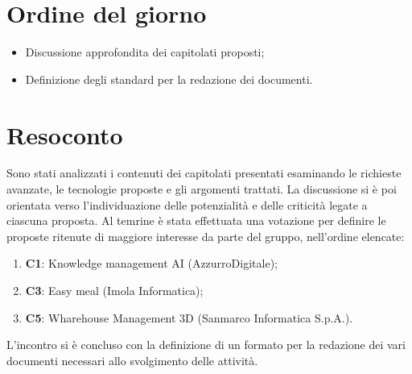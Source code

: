 \section{Ordine del giorno}
\begin{itemize}
    \item Discussione approfondita dei capitolati proposti;
    \item Definizione degli standard per la redazione dei documenti.
\end{itemize}

\section{Resoconto}
Sono stati analizzati i contenuti dei capitolati presentati esaminando le richieste avanzate, le tecnologie proposte e gli argomenti trattati.
La discussione si è poi orientata verso l'individuazione delle potenzialità e delle criticità legate a ciascuna proposta. 
Al temrine è stata effettuata una votazione per definire le proposte ritenute di maggiore interesse da parte del gruppo, nell'ordine elencate:
\begin{enumerate}
    \item \textbf{C1}: Knowledge management AI (AzzurroDigitale);
    \item \textbf{C3}: Easy meal (Imola Informatica);
    \item \textbf{C5}: Wharehouse Management 3D (Sanmarco Informatica S.p.A.).
\end{enumerate}

L'incontro si è concluso con la definizione di un formato per la redazione dei vari documenti necessari allo svolgimento delle attività.
